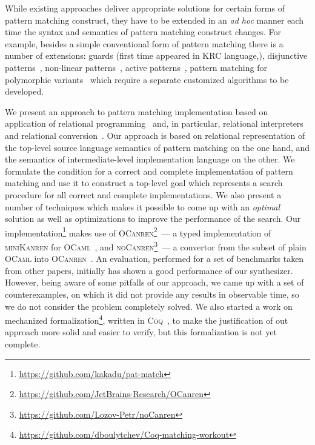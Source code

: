While existing approaches deliver appropriate solutions for certain forms of pattern matching construct, they have to be extended in an \emph{ad hoc} manner each time
the syntax and semantics of pattern matching construct changes. For example, besides a simple conventional form of pattern matching there is a number of extensions:
guards (first time appeared in KRC language,\cite{turner2013}), disjunctive patterns~\cite{?}, non-linear patterns~\cite{mcbride1969symbol}, active patterns~\cite{activepatterns}, pattern matching for polymorphic variants~\cite{Garrigue98} 
which require a separate customized algorithms to be developed.

\begin{comment}
\begin{minipage}[b]{0.5\textwidth}
There are a few different approaches for compiling pattern mathcing. For example, \textsc{GHC}~\cite{?} uses that presented in an influential paper~\cite{Jones1987},
implementation of pattern matching in \textsc{OCaml} is currently based on~\cite{maranget2001} although \cite{maranget2008} reports a slight improvements
of generated code efficiency. 
\end{minipage}
\end{comment}

We present an approach to pattern matching implementation based on application of relational programming~\cite{TRS,WillThesis} and, in particular, relational interpreters~\cite{unified}
and relational conversion~\cite{lozov2017}. Our approach is based on relational representation of the top-level source language semantics of pattern matching on the one hand, and
the semantics of intermediate-level implementation language on the other. We formulate the condition for a correct and complete implementation of pattern matching and use it to
construct a top-level goal which represents a search procedure for all correct and complete implementations. We also present a number of techniques which makes it possible to come up with an
\emph{optimal} solution as well as optimizations to improve the performance of the search. Our implementation\footnote{\url{https://github.com/kakadu/pat-match}} makes use of
\textsc{OCanren}\footnote{\url{https://github.com/JetBrains-Research/OCanren}}~--- a typed implementation of \textsc{miniKanren} for \textsc{OCaml}~\cite{OCanren},
and \textsc{noCanren}\footnote{\url{https://github.com/Lozov-Petr/noCanren}}~--- a convertor from the subset of plain \textsc{OCaml} into \textsc{OCanren}~\cite{lozov2017}.
An evaluation, performed for a set of benchmarks taken from other papers, initially has shown a good performance of our synthesizer. However, being aware of some pitfalls of
our approach, we came up with a set of counterexamples, on which it did not provide any results in observable time, so we do not consider the problem completely solved.
We also started a work on mechanized formalization\footnote{\url{https://github.com/dboulytchev/Coq-matching-workout}}, written in \textsc{Coq}~\cite{Coq}, to
make the justification of out approach more solid and easier to verify, but this formalization is not yet complete. 

 

